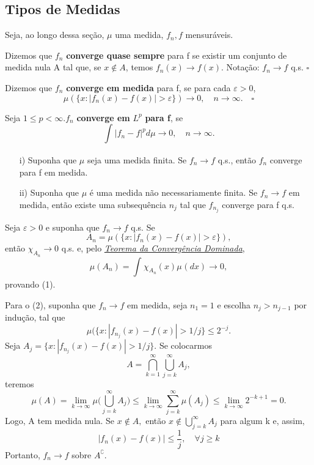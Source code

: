 \documentclass[MeasureTheory/measure_theory.tex]{subfiles}
\begin{document}
\subsection{Tipos de Medidas}
Seja, ao longo dessa seção, \(\mu \) uma medida, \(f_{n}, f\) mensuráveis.
\begin{def*}
	Dizemos que \(f_{n}\) \textbf{converge quase sempre} para f se existir um conjunto de medida nula A tal que, se \(x\not\in A\), temos \(f_{n}(x)\to f(x).\) Notação: \(f_{n}\to f\) q.s. \(\square\)
\end{def*}
\begin{def*}
	Dizemos que \(f_{n}\) \textbf{converge em medida} para f, se para cada \(\varepsilon  > 0\),
	\[
		\mu (\{x: |f_{n}(x) - f(x)| > \varepsilon \})\to 0,\quad n\to \infty.\quad \square
	\]
\end{def*}
\begin{def*}
	Seja \(1\leq p < \infty. f_{n}\)\textbf{ converge em }\(L^{p}\)\textbf{ para f}, se
	\[
		\int_{}|f_{n} - f|^{p} d\mu\to 0,\quad n\to \infty.
	\]
\end{def*}
\begin{prop*}
	\begin{itemize}
		\item[i)]Suponha que \(\mu \) seja uma medida finita. Se \(f_{n}\to f\) q.s., então \(f_{n}\) converge para f em medida.
		\item[ii)] Suponha que \(\mu \) é uma medida não necessariamente finita. Se \(f_{n}\to f\) em medida, então existe uma subsequência \(n_{j}\) tal que \(f_{n_{j}}\) converge para f q.s.
	\end{itemize}
\end{prop*}
\begin{proof*}
	Seja \(\varepsilon > 0\) e suponha que \(f_{n}\to f\) q.s. Se
	\[
		A_{n} = \mu (\{x: |f_{n}(x) - f(x)| > \varepsilon \}),
	\]
	então \(\chi_{A_{n}}\to 0\) q.s. e, pelo \hyperlink{dominated_convergence}{\textit{Teorema da Convergência Dominada}},
	\[
		\mu (A_{n}) = \int_{}\chi_{A_{n}}(x) \mu_{}(dx)\to 0,
	\]
	provando (1).

	Para o (2), suponha que \(f_{n}\to f\) em medida, seja \(n_1 = 1\) e escolha \(n_{j} > n_{j-1}\) por indução, tal que
	\[
		\mu (\{x: |f_{n_{j}}(x) - f(x)| > 1/j\} \leq 2^{-j}.
	\]
	Seja \(A_{j} = \{x: |f_{n_{j}}(x) - f(x)| > 1/j\}.\) Se colocarmos
	\[
		A = \bigcap_{k=1}^{\infty}\bigcup_{j=k}^{\infty}A_{j},
	\]
	teremos
	\[
		\mu (A) = \lim_{k\to \infty}\mu \biggl(\bigcup_{j=k}^{\infty}A_{j}\biggr) \leq \lim_{k\to \infty}\sum\limits_{j=k}^{\infty}\mu (A_{j}) \leq \lim_{k\to \infty}2^{-k+1} = 0.
	\]
	Logo, A tem medida nula. Se \(x\not\in A,\) então \(x\not\in \bigcup_{j=k}^{\infty}A_{j}\) para algum k e, assim,
	\[
		|f_{n}(x)-f(x)|\leq \frac{1}{j},\quad \forall j\geq k
	\]
	Portanto, \(f_{n}\to f\) sobre \(A ^{\complement}\). \qedsymbol
\end{proof*}
\end{document}
